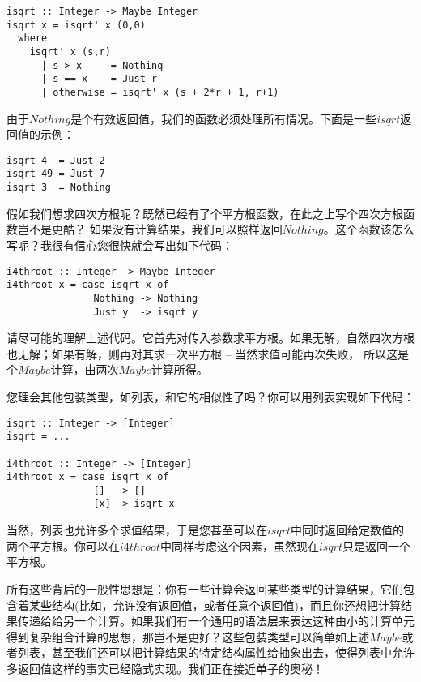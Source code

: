 \begin{lstlisting}
isqrt :: Integer -> Maybe Integer
isqrt x = isqrt' x (0,0)
  where
    isqrt' x (s,r)
      | s > x     = Nothing
      | s == x    = Just r
      | otherwise = isqrt' x (s + 2*r + 1, r+1)
\end{lstlisting}

由于$Nothing$是个有效返回值，我们的函数必须处理所有情况。下面是一些$isqrt$返回值的示例：

\begin{lstlisting}
isqrt 4  = Just 2
isqrt 49 = Just 7
isqrt 3  = Nothing
\end{lstlisting}

假如我们想求四次方根呢？既然已经有了个平方根函数，在此之上写个四次方根函数岂不是更酷？ 如果没有计算结果，我们可以照样返回$Nothing$。这个函数该怎么写呢？我很有信心您很快就会写出如下代码：

\begin{lstlisting}
i4throot :: Integer -> Maybe Integer
i4throot x = case isqrt x of
               Nothing -> Nothing
               Just y  -> isqrt y
\end{lstlisting}

请尽可能的理解上述代码。它首先对传入参数求平方根。如果无解，自然四次方根也无解；如果有解，则再对其求一次平方根 -- 当然求值可能再次失败， 所以这是个$Maybe$计算，由两次$Maybe$计算所得。

您理会其他包装类型，如列表，和它的相似性了吗？你可以用列表实现如下代码：

\begin{lstlisting}
isqrt :: Integer -> [Integer]
isqrt = ...

i4throot :: Integer -> [Integer]
i4throot x = case isqrt x of
               []  -> []
               [x] -> isqrt x
\end{lstlisting}

当然，列表也允许多个求值结果，于是您甚至可以在$isqrt$中同时返回给定数值的两个平方根。你可以在$i4throot$中同样考虑这个因素，虽然现在$isqrt$只是返回一个平方根。

所有这些背后的一般性思想是：你有一些计算会返回某些类型的计算结果，它们包含着某些结构(比如，允许没有返回值，或者任意个返回值)，而且你还想把计算结果传递给给另一个计算。如果我们有一个通用的语法层来表达这种由小的计算单元得到复杂组合计算的思想，那岂不是更好？这些包装类型可以简单如上述$Maybe$或者列表，甚至我们还可以把计算结果的特定结构属性给抽象出去，使得列表中允许多返回值这样的事实已经隐式实现。我们正在接近单子的奥秘！
